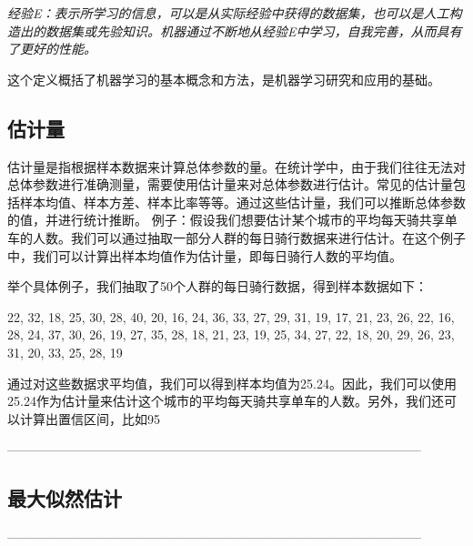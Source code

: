 \documentclass{article}
\begin{document}
\textit{经验E：表示所学习的信息，可以是从实际经验中获得的数据集，也可以是人工构造出的数据集或先验知识。机器通过不断地从经验E中学习，自我完善，从而具有了更好的性能。}

这个定义概括了机器学习的基本概念和方法，是机器学习研究和应用的基础。


\subsection{估计量}
估计量是指根据样本数据来计算总体参数的量。在统计学中，由于我们往往无法对总体参数进行准确测量，需要使用估计量来对总体参数进行估计。常见的估计量包括样本均值、样本方差、样本比率等等。通过这些估计量，我们可以推断总体参数的值，并进行统计推断。
例子：假设我们想要估计某个城市的平均每天骑共享单车的人数。我们可以通过抽取一部分人群的每日骑行数据来进行估计。在这个例子中，我们可以计算出样本均值作为估计量，即每日骑行人数的平均值。

举个具体例子，我们抽取了50个人群的每日骑行数据，得到样本数据如下：

22, 32, 18, 25, 30, 28, 40, 20, 16, 24, 36, 33, 27, 29, 31, 19, 17, 21, 23, 26, 22, 16, 28, 24, 37, 30, 26, 19, 27, 35, 28, 18, 21, 23, 19, 25, 34, 27, 22, 18, 20, 29, 26, 23, 31, 20, 33, 25, 28, 19

通过对这些数据求平均值，我们可以得到样本均值为25.24。因此，我们可以使用25.24作为估计量来估计这个城市的平均每天骑共享单车的人数。另外，我们还可以计算出置信区间，比如95%

--------------------------------------------------------------------------------------------------
\subsection{最大似然估计}


--------------------------------------------------------------------------------------------------
\end{document}
